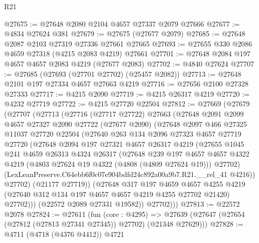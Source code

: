\begin{lexlean}{R21}
\begin{coremodule}
@27675 := @27648 @2080 @2104 @4657 @27337 @2079 @27666
@27677 := @4834 @27624 @381
@27679 := @27675 (@27677 @2079)
@27685 := @27648 @2087 @2103 @27319 @27336 @27661 @27665
@27693 := @27655 @330 @2086 @4659 @27318 (@4215 @2083 @4219) @27661
@27701 := @27648 @2084 @197 @4657 @4657 @2083 @4219 (@27677 @2083)
@27702 := @4840 @27624
@27707 := @27685 (@27693 (@27701 @27702) (@25457 @2082))
@27713 := @27648 @2101 @197 @27334 @4657 @27663 @4219
@27716 := @27656 @2100 @27328 @27333
@27717 := @4215 @2090
@27719 := @4215 @26317 @4219
@27720 := @4232 @27719
@27722 := @4215 @27720 @22504
@27812 := @27669
    (@27679
      (@27707
        (@27713
          (@27716
            (@27717 @27722)
            @27663
            (@27648
              @2091
              @2099
              @4657
              @27327
              @2090
              @27722
              (@27677 @2090)
              (@27648
                @2097
                @466
                @27325
                @11037
                @27720
                @22504
                (@27640
                  @263
                  @134
                  @2096
                  @27323
                  @4657
                  @27719
                  @27720
                  (@27648
                    @2094
                    @197
                    @27321
                    @4657
                    @26317
                    @4219
                    (@27655
                      @1045
                      @241
                      @4659
                      @26313
                      @4324
                      @26317
                      (@27648
                        @239
                        @197
                        @4657
                        @4657
                        @4322
                        @4219
                        (@4803 @27624 @19 @4322 (@4808 (@4809 @27624 @19)))
                        @27702)
                      (LexLeanPreserve.C64ebb6f0c07e904bdfd24c892a00a9b7.R21.__rel_41 @4216))
                    @27702)
                  (@21177 @27719))
                (@27648
                  @317
                  @197
                  @4659
                  @4657
                  @4255
                  @4219
                  (@27640 @312 @134 @197 @4657 @4657 @4219 @4255 @27702 @21420)
                  @27702)))
            (@22572 @2089 @27331 @19582))
          @27702)))
@27813 := @22572 @2078
@27824 := @27611
    (fun (core : @4295) =>
    @27639 (@27647 (@27654 (@27812 (@27813 @27341 @27345)) @27702) (@21348 @27629)))
@27828 := @4711 (@4718 (@4376 @4412)) @4721

\end{coremodule}
\end{lexlean}
